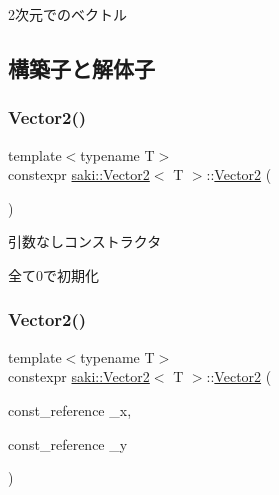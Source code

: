 2次元でのベクトル 

\subsection{構築子と解体子}
\mbox{\label{classsaki_1_1_vector2_af57b72f4255812a361bef1922a226f86}} 
\subsubsection{\texorpdfstring{Vector2()}{Vector2()}\hspace{0.1cm}{\footnotesize\ttfamily [1/5]}}
{\footnotesize\ttfamily template$<$typename T$>$ \\
constexpr \mbox{\hyperlink{classsaki_1_1_vector2}{saki\+::\+Vector2}}$<$ T $>$\+::\mbox{\hyperlink{classsaki_1_1_vector2}{Vector2}} (\begin{DoxyParamCaption}{ }\end{DoxyParamCaption})\hspace{0.3cm}{\ttfamily [inline]}}



引数なしコンストラクタ 

全て0で初期化 \mbox{\label{classsaki_1_1_vector2_abb15c5d7f0a663f4c6b179012bd942b4}} 
\subsubsection{\texorpdfstring{Vector2()}{Vector2()}\hspace{0.1cm}{\footnotesize\ttfamily [2/5]}}
{\footnotesize\ttfamily template$<$typename T$>$ \\
constexpr \mbox{\hyperlink{classsaki_1_1_vector2}{saki\+::\+Vector2}}$<$ T $>$\+::\mbox{\hyperlink{classsaki_1_1_vector2}{Vector2}} (\begin{DoxyParamCaption}\item[{const\+\_\+reference}]{\+\_\+x,  }\item[{const\+\_\+reference}]{\+\_\+y }\end{DoxyParamCaption})\hspace{0.3cm}{\ttfamily [inline]}}




